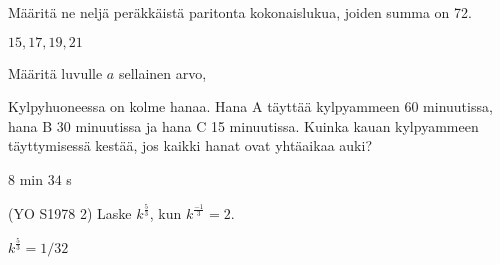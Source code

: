 \begin{tehtavasivu}
\begin{tehtava}
Määritä ne neljä peräkkäistä paritonta kokonaislukua, joiden summa on 72.
	\begin{vastaus}
	 $15, 17, 19, 21$
	\end{vastaus}
\end{tehtava}


\begin{tehtava}
Määritä luvulle $a$ sellainen arvo, 
  \begin{alakohdat}
  \end{alakohdat}
\begin{vastaus}
   \begin{alakohdat}
      \end{alakohdat}
\end{vastaus}
\end{tehtava}

\begin{tehtava}
Kylpyhuoneessa on kolme hanaa. Hana A täyttää kylpyammeen 60 minuutissa, hana B 30 minuutissa ja hana C 15 minuutissa. Kuinka kauan kylpyammeen täyttymisessä kestää, jos kaikki hanat ovat yhtäaikaa auki?
\begin{vastaus}
$8$ min $34$ s
\end{vastaus}
\end{tehtava}

\begin{tehtava} 
(YO S1978 2) Laske $k^\frac{5}{3}$, kun $k^\frac{-1}{3}=2$. \\
	\begin{vastaus}
		$k^\frac{5}{3}=1/32$
	\end{vastaus}
\end{tehtava}


\end{tehtavasivu}
